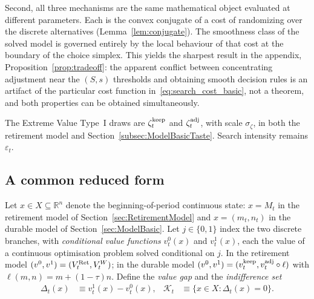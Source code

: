 Second, all three mechanisms are the same mathematical object evaluated at different
parameters. Each is the convex conjugate of a cost of randomizing over the discrete
alternatives (Lemma~\ref{lem:conjugate}). The smoothness class of the solved model is
governed entirely by the local behaviour of that cost at the boundary of the choice
simplex. This yields the sharpest result in the appendix,
Proposition~\ref{prop:tradeoff}: the apparent conflict between concentrating
adjustment near the $(S,s)$ thresholds and obtaining smooth decision rules is an
artifact of the particular cost function in~\eqref{eq:search_cost_basic}, not a
theorem, and both properties can be obtained simultaneously.

\begin{remark}[Notation]
\label{rem:notation}
The Extreme Value Type~I draws are $\zeta_t^{\mathrm{keep}}$ and $\zeta_t^{\mathrm{adj}}$, with scale
$\sigma_\zeta$, in both the retirement model and Section~\ref{subsec:ModelBasicTaste}.
Search intensity remains $\varepsilon_t$.
\end{remark}

\subsection{A common reduced form}
\label{subsec:smooth_framework}

Let $x\in X\subseteq\mathbb{R}^{n}$ denote the beginning-of-period continuous state:
$x=M_t$ in the retirement model of Section~\ref{sec:RetirementModel} and
$x=(m_t,n_t)$ in the durable model of Section~\ref{sec:ModelBasic}. Let
$j\in\{0,1\}$ index the two discrete branches, with \emph{conditional value functions}
$v_t^{0}(x)$ and $v_t^{1}(x)$, each the value of a continuous optimisation problem
solved conditional on $j$. In the retirement model $(v^0,v^1)=(V_t^{\mathrm{Ret}},V_t^{W})$;
in the durable model $(v^0,v^1)=(v_t^{\mathrm{keep}},v_t^{\mathrm{adj}}\circ\ell)$ with
$\ell(m,n)=m+(1-\tau)n$. Define the \emph{value gap} and the \emph{indifference set}
\begin{align}
\Delta_t(x) &\equiv v_t^{1}(x)-v_t^{0}(x),
&
\mathcal{K}_t &\equiv \{x\in X:\Delta_t(x)=0\}.
\end{align}

